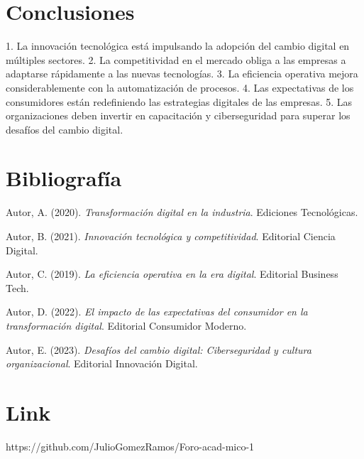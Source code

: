\documentclass[letterpaper,12pt]{article}
\begin{document}
\section*{Conclusiones}
1. La innovación tecnológica está impulsando la adopción del cambio digital en múltiples sectores.
2. La competitividad en el mercado obliga a las empresas a adaptarse rápidamente a las nuevas tecnologías.
3. La eficiencia operativa mejora considerablemente con la automatización de procesos.
4. Las expectativas de los consumidores están redefiniendo las estrategias digitales de las empresas.
5. Las organizaciones deben invertir en capacitación y ciberseguridad para superar los desafíos del cambio digital.

\section*{Bibliografía}
Autor, A. (2020). \textit{Transformación digital en la industria}. Ediciones Tecnológicas.

Autor, B. (2021). \textit{Innovación tecnológica y competitividad}. Editorial Ciencia Digital.

Autor, C. (2019). \textit{La eficiencia operativa en la era digital}. Editorial Business Tech.

Autor, D. (2022). \textit{El impacto de las expectativas del consumidor en la transformación digital}. Editorial Consumidor Moderno.

Autor, E. (2023). \textit{Desafíos del cambio digital: Ciberseguridad y cultura organizacional}. Editorial Innovación Digital.

\section*{Link} 
https://github.com/JulioGomezRamos/Foro-acad-mico-1
\end{document}
